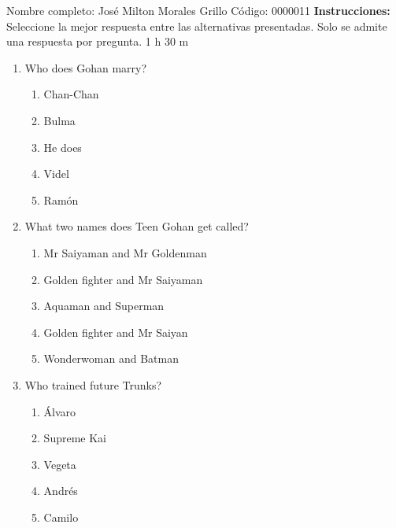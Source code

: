 \documentclass[letterpaper,addpoints,answers,twocolumn,10pt]{exam}
\begin{document}
\noindent Nombre completo: José Milton Morales Grillo
\newline \newline \newline \newline
Código: 0000011\newline \newline 
{\bf Instrucciones:} Seleccione la mejor respuesta entre las alternativas presentadas. Solo se admite una respuesta por pregunta.
 1 h 30 m

\begin{enumerate}[leftmargin=.2in]




\item  Who does Gohan marry?


\begin{enumerate}[noitemsep,leftmargin=0in]


\item  Chan-Chan
\item  Bulma
\item  He does
\item  Videl
\item  Ramón


\end{enumerate}



\item  What two names does Teen Gohan get called?


\begin{enumerate}[noitemsep,leftmargin=0in]


\item  Mr Saiyaman and Mr Goldenman
\item  Golden fighter and Mr Saiyaman
\item  Aquaman and Superman
\item  Golden fighter and Mr Saiyan
\item  Wonderwoman and Batman


\end{enumerate}



\item  Who trained future Trunks?


\begin{enumerate}[noitemsep,leftmargin=0in]


\item  Álvaro
\item  Supreme Kai
\item  Vegeta
\item  Andrés
\item  Camilo



\end{enumerate}
\end{enumerate}
\end{document}

